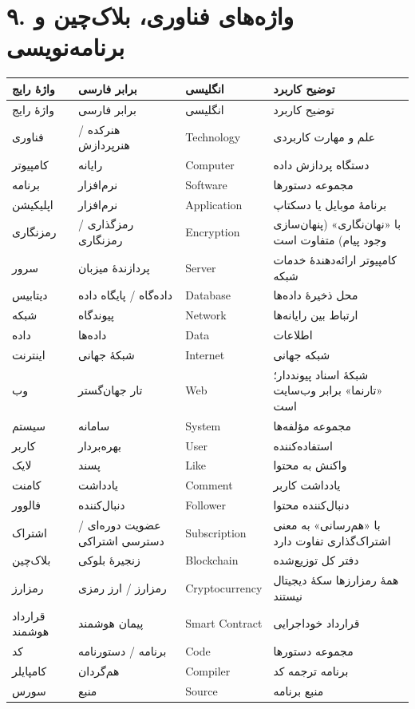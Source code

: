 \documentclass[a4paper,12pt,openany]{book}
\begin{document}
\section*{۹. واژه‌های فناوری، بلاک‌چین و برنامه‌نویسی}
\begingroup
\small
\setlength{\tabcolsep}{4pt}
\renewcommand{\arraystretch}{1.25}
\begin{longtable}{|p{2.5cm}|p{4.0cm}|p{2.3cm}|p{5.3cm}|}
\hline
واژهٔ رایج & برابر فارسی & انگلیسی & توضیح کاربرد \\
\hline
\endfirsthead
\hline
واژهٔ رایج & برابر فارسی & انگلیسی & توضیح کاربرد \\
\hline
\endhead
فناوری & هنرکده / هنرپردازش & \textenglish{Technology} & علم و مهارت کاربردی \\
کامپیوتر & رایانه & \textenglish{Computer} & دستگاه پردازش داده \\
برنامه & نرم‌افزار & \textenglish{Software} & مجموعه دستورها \\
اپلیکیشن & نرم‌افزار & \textenglish{Application} & برنامهٔ موبایل یا دسکتاپ \\
رمزنگاری & رمزگذاری / رمزنگاری & \textenglish{Encryption} & با «نهان‌نگاری» (پنهان‌سازی وجود پیام) متفاوت است \\
سرور & پردازندهٔ میزبان & \textenglish{Server} & کامپیوتر ارائه‌دهندهٔ خدمات شبکه \\
دیتابیس & داده‌گاه / پایگاه داده & \textenglish{Database} & محل ذخیرهٔ داده‌ها \\
شبکه & پیوندگاه & \textenglish{Network} & ارتباط بین رایانه‌ها \\
داده & داده‌ها & \textenglish{Data} & اطلاعات \\
اینترنت & شبکهٔ جهانی & \textenglish{Internet} & شبکه جهانی \\
وب & تار جهان‌گستر & \textenglish{Web} & شبکهٔ اسناد پیونددار؛ «تارنما» برابر وب‌سایت است \\
سیستم & سامانه & \textenglish{System} & مجموعه مؤلفه‌ها \\
کاربر & بهره‌بردار & \textenglish{User} & استفاده‌کننده \\
لایک & پسند & \textenglish{Like} & واکنش به محتوا \\
کامنت & یادداشت & \textenglish{Comment} & یادداشت کاربر \\
فالوور & دنبال‌کننده & \textenglish{Follower} & دنبال‌کننده محتوا \\
اشتراک & عضویت دوره‌ای / دسترسی اشتراکی & \textenglish{Subscription} & با «هم‌رسانی» به معنی اشتراک‌گذاری تفاوت دارد \\
بلاک‌چین & زنجیرهٔ بلوکی & \textenglish{Blockchain} & دفتر کل توزیع‌شده \\
رمزارز & رمزارز / ارز رمزی & \textenglish{Cryptocurrency} & همهٔ رمزارزها سکهٔ دیجیتال نیستند \\
قرارداد هوشمند & پیمان هوشمند & \textenglish{Smart Contract} & قرارداد خوداجرایی \\
کد & برنامه / دستورنامه & \textenglish{Code} & مجموعه دستورها \\
کامپایلر & هم‌گردان & \textenglish{Compiler} & برنامه ترجمه کد \\
سورس & منبع & \textenglish{Source} & منبع برنامه \\
\hline
\end{longtable}
\endgroup
\end{document}
